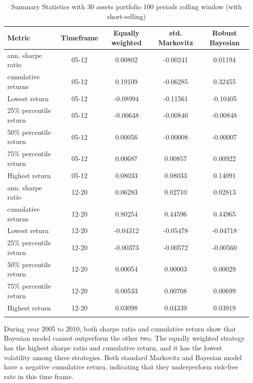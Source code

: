 \begin{table}[h]
\begin{center}
\begin{tabular}{l c c c c}
\textbf{Metric} & \textbf{Timeframe} & \textbf{Equally weighted} & \textbf{std. Markovitz} & \textbf{Robust Bayesian}\\ 
\hline
ann. sharpe ratio & 05-12 & 0.00802
 & -0.00241
 & 0.01194 \\ 
cumulative returns & 05-12 & 0.19109
 & -0.06285
 & 0.32455 \\  
Lowest return & 05-12 & -0.08994
 & -0.11561
 & -0.10405 \\
25\% percentile return & 05-12 & -0.00648
 & -0.00840
 & -0.00848 \\
50\% percentile return & 05-12 & 0.00056
 & -0.00008
 & -0.00007 \\
75\% percentile return & 05-12 & 0.00687
 & 0.00857
 & 0.00922 \\
Highest return & 05-12 & 0.08033
 & 0.08033
 & 0.14091 \\
\hline
ann. sharpe ratio & 12-20 & 0.06283 & 0.02710 & 0.02813 \\
cumulative returns & 12-20 & 0.80254 & 0.44596 & 0.44965 \\
Lowest return & 12-20 & -0.04312 & -0.05478 & -0.04718 \\
25\% percentile return & 12-20 & -0.00373 & -0.00572
 & -0.00560 \\
50\% percentile return & 12-20 & 0.00054 & 0.00003 & 0.00029 \\
75\% percentile return & 12-20 & 0.00533 & 0.00708 & 0.00699 \\
Highest return & 12-20 & 0.03098 & 0.04339 & 0.03919  \\
\hline
\caption{Summary Statistics with 30 assets portfolio 100 periods rolling window (with short-selling)}
\end{tabular}
\end{center}
\end{table}
During year 2005 to 2010, both sharpe ratio and cumulative return show that Bayesian model cannot outperform the other two. The equally weighted strategy has the highest sharpe ratio and cumulative return, and it has the lowest volatility among three strategies. Both standard Markovitz and Bayesian model have a negative cumulative return, indicating that they underperform risk-free rate in this time frame. \\
\\
